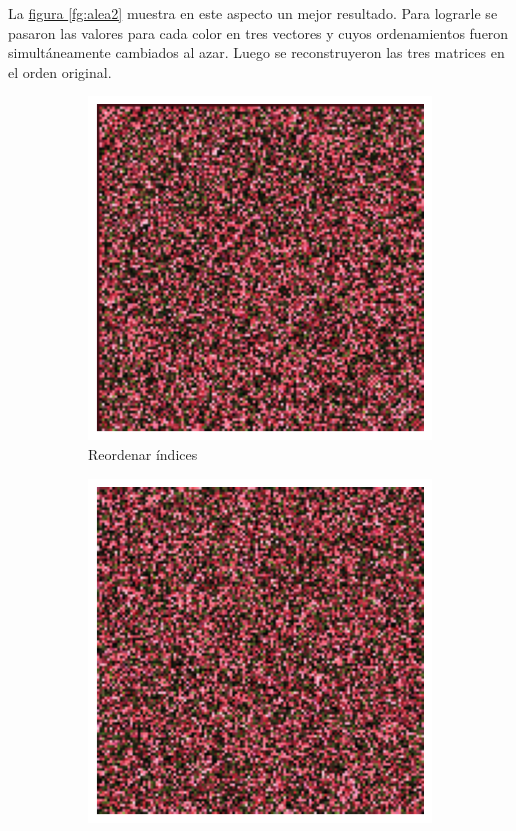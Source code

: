 \documentclass{article}
\begin{document}
La \hyperref[fg:alea2]{figura \ref*{fg:alea2}} muestra en este aspecto un mejor resultado.
Para lograrle se pasaron las valores para cada color en tres vectores y cuyos ordenamientos fueron simultáneamente cambiados al azar.
Luego se reconstruyeron las tres matrices en el orden original.

\begin{figure}
	\centering
	\begin{subfigure}[b]{0.24\textwidth}
		\includegraphics[width= \textwidth]{alea1}
		\caption{Reordenar índices}
		\label{fg:alea1}
	\end{subfigure}
	\begin{subfigure}[b]{0.24\textwidth}
		\includegraphics[width= \textwidth]{alea2}

\end{subfigure}
\end{figure}
\end{document}
